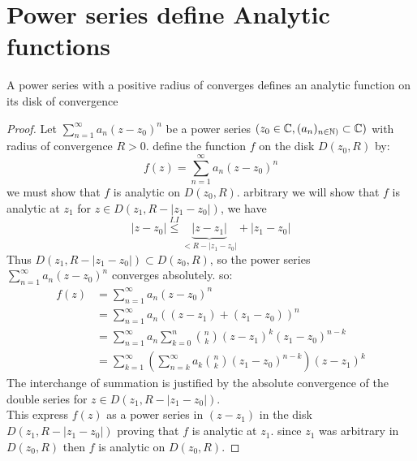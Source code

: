  \section{Power series define Analytic functions}
  \begin{theorem}[]
  A power series with a positive radius of converges defines an analytic function on its disk of convergence
  \end{theorem}
  \begin{proof}
  Let $\sum_{n=1}^{\infty} a_n (z-z_0) ^n  $ be a power series $(z_0 \in  \mathbb{C} , (a_n ) _{n \in  \mathbb{N})} \subset \mathbb{C} )  $ 
  with radius of convergence $R > 0 $. define the function $f $ on the disk $D(z_0, R)  $ by: 
  \[
  f(z)  = \sum_{n=1}^{\infty} a_n (z-z_0) ^n 
  \]
  we must show that $f $ is analytic on $D(z_0, R)$. arbitrary we will show that $f $ 
  is analytic at $z_1 $ for $z \in   D(z_1, R - \left| z_1-z_0 \right|  )  $, we have 
  \[
  \left| z-z_0 \right|  \overset{I.I}{ \leq } 
  \underbrace{
    \left| z-z_1 \right|  
  }_
 {
   < R - \left| z_1-z_0 \right|  
 } 
 + \left| z_1-z_0 \right|  
  \]
  Thus $D(z_1, R - \left| z_1-z_0 \right|  )  \subset D(z_0, R)  $, so the power series 
  $\sum_{n=1}^{\infty} a_n (z-z_0) ^n  $ converges absolutely. so: 
  \begin{align*}
    f(z) &= \sum_{n=1}^{\infty} a_n (z-z_0) ^n \\
         &= 
         \sum_{n=1}^{\infty} a_n ((z-z_1)  + (z_1 - z_0) ) ^n 
         \\
         &= 
         \sum_{n=1}^{\infty} a_n \sum_{k=0}^{n}  
         \binom{n}{k} 
         (z-z_1) ^{k} (z_1-z_0) ^{n-k}
         \\
         &= 
         \sum_{k=1}^{\infty} \left( 
           \sum_{n=k}^{\infty } a_{k}
           \binom{ n}{k} 
           (z_1 - z_0) ^{n-k}
         \right) 
         (z-z_1) ^{k}
  \end{align*}
  The interchange of summation is justified by the absolute convergence of the double
  series for $z \in   D(z_1, R - \left| z_1- z_0 \right|  )  $. \\
  This express $f(z)  $ as a power series in $(z-z_1)  $ in the disk $D(z_1, R - \left| z_1-z_0 \right|  )  $ proving
  that $f $ is analytic at $z_1 $. since $z_1 $ was arbitrary in $D(z_0, R)  $ then $f $ is analytic on 
  $D(z_0, R)$. 
  \end{proof}
